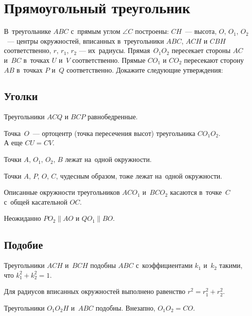 
\section*{Прямоугольный треугольник}



В~треугольнике $ABC$ с~прямым углом $\angle C$ построены:
$CH$~--- высота,
$O$, $O_1$, $O_2$~--- центры окружностей, вписанных в~треугольники
$ABC$, $ACH$ и $CBH$ соответственно,
$r$, $r_1$, $r_2$ --- их~радиусы.
Прямая~$O_1 O_2$ пересекает стороны $AC$ и~$BC$ в~точках $U$ и~$V$
соответственно.
Прямые $C O_1$ и $C O_2$ пересекают сторону~$AB$ в~точках $P$ и~$Q$
соответственно.
Докажите следующие утверждения:

\subsection*{Уголки}

\begin{problems}

\item
Треугольники $ACQ$ и $BCP$ равнобедренные.

\item
\sp
Точка~$O$~--- ортоцентр (точка пересечения высот) треугольника $C O_1 O_2$.
\\
\sp
А еще $CU = CV$.

\item
Точки $A$, $O_1$, $O_2$, $B$ лежат на~одной окружности.

\item
Точки $A$, $P$, $O$, $C$, чудесным образом, тоже лежат на~одной окружности.

\item
Описанные окружности треугольников $A C O_1$ и~$B C O_2$ касаются в~точке~$C$
с~общей касательной $OC$.

\item
Неожиданно $P O_2 \parallel A O$ и $Q O_1 \parallel B O$.

\end{problems}


\subsection*{Подобие}

\begin{problems}

\item
Треугольники $ACH$ и~$BCH$ подобны $ABC$ с~коэффициентами $k_1$ и~$k_2$ такими,
что $k_1^2 + k_2^2 = 1$.

\item
Для радиусов вписанных окружностей выполнено равенство $r^2 = r_1^2 + r_2^2$.

\item
Треугольники $O_1 O_2 H$ и~$ABC$ подобны.
\qquad
\problem
Внезапно, $O_1 O_2 = C O$.

\end{problems}

